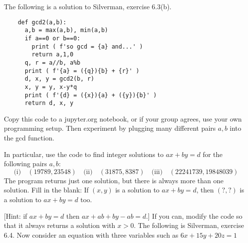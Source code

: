 \documentclass[12pt]{exam}
\begin{document}
\begin{questions}
  \question The following is a solution to Silverman, exercise 6.3(b).
  \begin{lstlisting}
    def gcd2(a,b):
      a,b = max(a,b), min(a,b)
      if a==0 or b==0:
        print ( f'so gcd = {a} and...' )
        return a,1,0
      q, r = a//b, a%b
      print ( f'{a} = ({q}){b} + {r}' )
      d, x, y = gcd2(b, r)
      x, y = y, x-y*q
      print ( f'{d} = ({x}){a} + ({y}){b}' )
      return d, x, y
  \end{lstlisting}
  Copy this code to a jupyter.org notebook, or if your group agrees, use your own programming setup. Then experiment by plugging many different pairs $a,b$ into the gcd function.

  In particular, use the code to find integer solutions to $ax+by=d$ for the following pairs $a,b$:
  \[\text{(i)}\quad(19789, 23548)\quad
  \text{(ii)}\quad(31875, 8387)\quad
  \text{(iii)}\quad(22241739, 19848039)
    \]
  \vspace{\fill}
  \question The program returns just one solution, but there is always more than one solution. Fill in the blank: If $(x,y)$ is a solution to $ax+by=d$, then $(?,?)$ is a solution to $ax+by=d$ too.

  [Hint: if $ax+by=d$ then $ax+ab+by-ab=d$.]
  \vspace{\fill}
  \question If you can, modify the code so that it always returns a solution with $x>0$.
  \newpage
  \question The following is Silverman, exercise 6.4. Now consider an equation with three variables such as $6x+15y+20z=1$
\end{questions}
\end{document}

